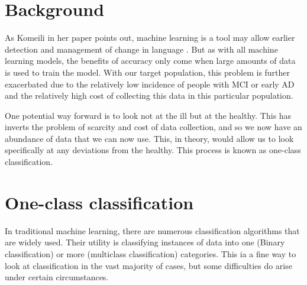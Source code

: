 \section{Background}
As Komeili in her paper points out, machine learning is a tool may allow earlier detection and management of change in language \cite{Komeili2019}. But as with all machine learning models, the benefits of accuracy only come when large amounts of data is used to train the model. With our target population, this problem is further exacerbated due to the relatively low incidence of people with MCI or early AD and the relatively high cost of collecting this data in this particular population. 
\par 
One potential way forward is to look not at the ill but at the healthy. This has inverts the problem of scarcity and cost of data collection, and so we now have an abundance of data that we can now use. This, in theory, would allow us to look specifically at any deviations from the healthy. This process is known as one-class classification.
\par 
 
\section{One-class classification}
In traditional machine learning, there are numerous classification algorithms that are widely used. Their utility is classifying instances of data into one (Binary classification) or more (multiclass classification) categories. This ia a fine way to look at classification in the vast majority of cases, but some difficulties do arise under certain circumstances. 